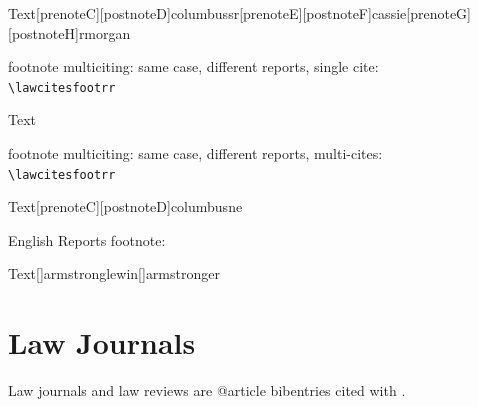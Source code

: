 \begin{filecontents}{\democodefile}
Text[prenoteC][postnoteD]{columbussr}[prenoteE][postnoteF]{cassie}[prenoteG][postnoteH]{rmorgan}
\end{filecontents}
\PrintCodeAndResultsStackedR

\spotsep




\noindent
\theball
footnote multiciting: same case, different reports, single cite: \\
\verb|\lawcitesfootrr|
\bigskip


\begin{filecontents}{\democodefile}
Text
\end{filecontents}
\PrintCodeAndResultsStackedR

\spotsep


\noindent
\theball
footnote multiciting: same case, different reports, multi-cites:  \\
\verb|\lawcitesfootrr|
\bigskip


\begin{filecontents}{\democodefile}
Text[prenoteC][postnoteD]{columbusne}
\end{filecontents}
\PrintCodeAndResultsStackedR
\spotsep

English Reports footnote:


\begin{filecontents}{\democodefile}
Text[]{armstronglewin}[]{armstronger}\end{filecontents}
\PrintCodeAndResultsStackedR
\spotsep








\section{Law Journals}
Law journals and law reviews are @article bibentries cited with .

\begin{filecontents}{\democodefile}
\end{filecontents}
\bigskip
\hfill * \hfill\ 
\bigskip


